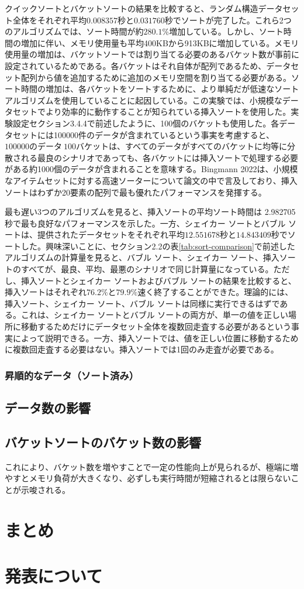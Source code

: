 \documentclass[a4j, 12pt]{jarticle}
\begin{document}
クイックソートとバケットソートの結果を比較すると、ランダム構造データセット全体をそれぞれ平均$0.008357$秒と$0.031760$秒でソートが完了した。これら2つのアルゴリズムでは、ソート時間が約$280.1\%$増加している。しかし、ソート時間の増加に伴い、メモリ使用量も平均400KBから913KBに増加している。メモリ使用量の増加は、バケットソートでは割り当てる必要のあるバケット数が事前に設定されているためである。各バケットはそれ自体が配列であるため、データセット配列から値を追加するために追加のメモリ空間を割り当てる必要がある。ソート時間の増加は、各バケットをソートするために、より単純だが低速なソートアルゴリズムを使用していることに起因している。この実験では、小規模なデータセットでより効率的に動作することが知られている挿入ソートを使用した\cite{bingmann2020faster}。実験設定セクション3.4.4で前述したように、100個のバケットも使用した。各データセットには100000件のデータが含まれているという事実を考慮すると、$100000のデータ \ 100バケット$は、すべてのデータがすべてのバケットに均等に分散される最良のシナリオであっても、各バケットには挿入ソートで処理する必要がある約1000個のデータが含まれることを意味する。Bingmann 2022は、小規模なアイテムセットに対する高速ソーターについて論文の中で言及しており、挿入ソートはわずか20要素の配列で最も優れたパフォーマンスを発揮する。\

最も遅い3つのアルゴリズムを見ると、挿入ソートの平均ソート時間は 2.982705 秒で最も良好なパフォーマンスを示した。一方、シェイカー ソートとバブル ソートは、提供されたデータセットをそれぞれ平均$12.551678$秒と$14.843409$秒でソートした。興味深いことに、セクション2.2の表\ref{tab:sort-comparison}で前述したアルゴリズムの計算量を見ると、バブル ソート、シェイカー ソート、挿入ソートのすべてが、最良、平均、最悪のシナリオで同じ計算量になっている。ただし、挿入ソートとシェイカー ソートおよびバブル ソートの結果を比較すると、挿入ソートはそれぞれ$76.2\%$と$79.9\%$速く終了することができた。理論的には、挿入ソート、シェイカー ソート、バブル ソートは同様に実行できるはずである。これは、シェイカー ソートとバブル ソートの両方が、単一の値を正しい場所に移動するためだけにデータセット全体を複数回走査する必要があるという事実によって説明できる。一方、挿入ソートでは、値を正しい位置に移動するために複数回走査する必要はない。挿入ソートでは1回のみ走査が必要である。\

\subsubsection{昇順的なデータ（ソート済み）}

\subsection{データ数の影響}
\subsection{バケットソートのバケット数の影響}
これにより、バケット数を増やすことで一定の性能向上が見られるが、極端に増やすとメモリ負荷が大きくなり、必ずしも実行時間が短縮されるとは限らないことが示唆される。
\section{まとめ}
\section{発表について}



\end{document}
